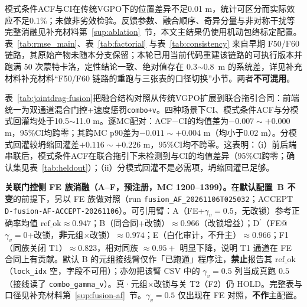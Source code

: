 \documentclass[UTF8,a4paper,zihao=-4]{ctexart}
\begin{document}
模式条件ACF与CI在传统VGPO下的位置差异不足0.01 m，统计可区分而实际效应不足0.1\%；未做非劣效检验。反馈参数、融合顺序、奇异分量与非对称干扰等完整消融见补充材料第~\ref{sup:ablation}~节，本文主结果仍使用机动包络标定配置。表~\ref{tab:rmse_main}、表~\ref{tab:factorial} 与表~\ref{tab:consistency} 来自早期 F50/F60 链路，其原始产物未随本分支保留；本轮已用当前代码重建该链路的可执行版本并跑满 50 次蒙特卡洛，定性结论一致、绝对值存在 0.3$\sim$0.8~m 的系统差，详见补充材料补充材料“F50/F60 链路的重跑与三张表的口径切换”小节。两者\textbf{不可混用}。
\begin{table}[htbp]
\centering
\caption{联合拖引合同下前后端串联的位置RMSE（m，20次蒙特卡洛；前端统一为双通道混合门控+速度惩罚\texttt{combo+v}+T1预筛；配对差为逐MC bootstrap 95\%CI）}\label{tab:jointdrag-fusion}
\small
{}
\end{table}

表~\ref{tab:jointdrag-fusion}把融合结构对照从传统VGPO扩展到联合拖引合同：前端统一为双通道混合门控+速度惩罚\texttt{combo+v}。四种场景下CI、模式条件ACF与分模式回灌均处于10.5\(\sim\)11.0 m。逐MC配对：ACF$-$CI的均值差为$-0.007\sim+0.000$ m，95\%CI均跨零；其跨MC p90差为$-0.011\sim+0.004$ m（均小于0.02 m）。分模式回灌较坍缩回灌差$+0.116\sim+0.226$ m，95\%CI均不跨零。这表明：（i）前后端串联后，模式条件ACF在联合拖引下未检测到与CI的均值差异（95\%CI跨零；确认集见表~\ref{tab:heldout}）；（ii）分模式回灌不是必需项，坍缩回灌已足够。

\noindent\textbf{关联门控侧 FE 族消融（A--F，预注册，MC 1200--1399）。}\quad 在\textbf{默认配置~B 不变}的前提下，另以 FE 族做对照（run \texttt{fusion\_AF\_20261106T025032}；ACCEPT \texttt{D-fusion-AF-ACCEPT-20261106}）。可引用臂：A（FE+$\gamma_v=0.5$，无改锁）参考正确率均值 $\mathrm{ref\_ok}\approx0.947$；B（同合同+改锁）$\approx0.966$（改锁增益）；D$^\prime$（FE@$\gamma_v=0$+改锁，\textbf{非}元组$\times$改锁）$\approx0.974$；E（白化审计，不升主）$\approx0.966$；F1（同族关闭 T1）$\approx0.823$，相对同族 $\approx0.95+$ 明显下降，说明 T1 通道在 FE 合同上有贡献。默认 B 的元组接线臂仅作「已跑通」程序注，\textbf{禁止}报告其 $\mathrm{ref\_ok}$（\texttt{lock\_idx} 空，字段不可用）；亦勿把该臂 CSV 中的 $\gamma_v=0.5$ 列当成真跑 $0.5$（接线读了 \texttt{combo\_gamma\_v}）。真·元组$\times$改锁与关 T2（F2）仍 HOLD。完整表与口径见补充材料第~\ref{sup:fusion-af}~节。$\gamma_v=0.5$ 仅出现在 FE 对照，\textbf{不作}主配置。
\end{document}
